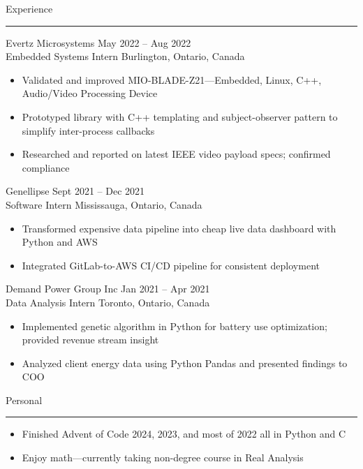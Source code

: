 \documentclass{article}
\newenvironment{mysection}[1]
{ {\large #1}

	\vspace{-1em}
	\rule{\linewidth}{0.4pt} 

} { \vspace{1em} }
\begin{document}
\begin{mysection}{Experience}
Evertz Microsystems \hfill May 2022 – Aug 2022 \\
Embedded Systems Intern \hfill Burlington, Ontario, Canada
\begin{itemize}[noitemsep,left=0pt,label={--}]
	\item Validated and improved MIO-BLADE-Z21—Embedded, Linux, C++, Audio/Video Processing Device
	\item Prototyped library with C++ templating and subject-observer pattern to simplify inter-process callbacks
	\item Researched and reported on latest IEEE video payload specs; confirmed compliance
\end{itemize}
\vspace{1em}

Genellipse \hfill Sept 2021 – Dec 2021 \\
Software Intern \hfill Mississauga, Ontario, Canada
\begin{itemize}[noitemsep,left=0pt,label={--}]
	\item Transformed expensive data pipeline into cheap live data dashboard with Python and AWS 
	\item Integrated GitLab-to-AWS CI/CD pipeline for consistent deployment
\end{itemize}
\vspace{1em}

Demand Power Group Inc \hfill Jan 2021 – Apr 2021 \\
Data Analysis Intern \hfill Toronto, Ontario, Canada
\begin{itemize}[noitemsep,left=0pt,label={--}]
	\item Implemented genetic algorithm in Python for battery use optimization; provided revenue stream insight
	\item Analyzed client energy data using Python Pandas and presented findings to COO
\end{itemize}
\end{mysection}

\begin{mysection}{Personal}
\begin{itemize}[noitemsep,left=0pt,label={--}]
	\item Finished Advent of Code 2024, 2023, and most of 2022 all in Python and C
	\item Enjoy math---currently taking non-degree course in Real Analysis
\end{itemize}
\end{mysection}
\end{document}
